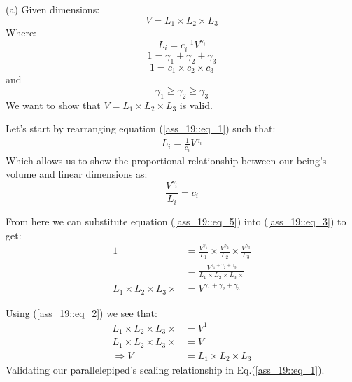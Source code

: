 \begin{enumerate}
(a) Given dimensions:\\
\begin{equation}
    V = L_1 \times
        L_2 \times
        L_3
        \label{ass_19::eq_1}
\end{equation}
Where:
\begin{equation}
   L_i = c_i^{-1}
         V^{\gamma_i}
         \label{ass_19::eq_2}
\end{equation}
\begin{equation}
   1 =  \gamma_1 + 
        \gamma_2 + 
        \gamma_3
        \label{ass_19::eq_3}
\end{equation}
\begin{equation}
   1 = c_1 \times
       c_2 \times
       c_3
       \label{ass_19::eq_4}
\end{equation}
and
\begin{equation}
   \gamma_1 \geq \gamma_2 \geq \gamma_3 \label{ass_19::gammas}
\end{equation}
We want to show that $V = L_1 \times L_2 \times L_3$ is valid.

Let's start by rearranging equation (\ref{ass_19::eq_1}) such that:
\begin{align*}
   L_i = \frac{1}{c_i}
         V^{\gamma_i}
\end{align*}
Which allows us to show the proportional relationship between our being's volume and linear dimensions as:
\begin{equation}
   \frac{V^{\gamma_i}}{L_i} = c_i \label{ass_19::eq_5}
\end{equation}

From here we can substitute equation (\ref{ass_19::eq_5}) into (\ref{ass_19::eq_3}) to get:
\begin{align*}
   1 &= 
        \frac{V^{\gamma_1}}{L_1}
        \times
        \frac{V^{\gamma_2}}{L_2}
        \times
        \frac{V^{\gamma_3}}{L_3}\\
     &= \frac{V^{\gamma_1 +
                 \gamma_2 +
                 \gamma_3}}
             {L_1 \times
              L_2 \times
              L_3 \times}\\
    L_1 \times
    L_2 \times
    L_3 \times &= V^{\gamma_1 +
                 \gamma_2 +
                 \gamma_3}
\end{align*}

Using (\ref{ass_19::eq_2}) we see that:
\begin{align*}
   L_1 \times
   L_2 \times
   L_3 \times &= V^{1}\\
   L_1 \times
   L_2 \times
   L_3 \times &= V \\
   \Rightarrow
   V &= 
   L_1 \times
   L_2 \times
   L_3 \label{ass_19::q_1_a}
\end{align*}
Validating our parallelepiped's scaling relationship in Eq.(\ref{ass_19::eq_1}).\clearpage


\end{enumerate}
